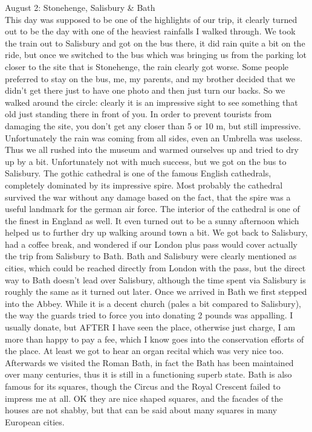 August 2: Stonehenge, Salisbury \& Bath\\
This day was supposed to be one of the highlights of our trip, it clearly turned out to be the day with one of the heaviest rainfalls I walked through. We took the train out to Salisbury and got on the bus there, it did rain quite a bit on the ride, but once we switched to the bus which was bringing us from the parking lot closer to the site that is Stonehenge, the rain clearly got worse. Some people preferred to stay on the bus, me, my parents, and my brother decided that we didn't get there just to have one photo and then just turn our backs. So we walked around the circle: clearly it is an impressive sight to see something that old just standing there in front of you. In order to prevent tourists from damaging the site, you don't get any closer than 5 or 10 m, but still impressive. Unfortunately the rain was coming from all sides, even an Umbrella was useless. Thus we all rushed into the museum and warmed ourselves up and tried to dry up by a bit. Unfortunately not with much success, but we got on the bus to Salisbury. The gothic cathedral is one of the famous English cathedrals, completely dominated by its impressive spire. Most probably the cathedral survived the war without any damage based on the fact, that the spire was a useful landmark for the german air force. The interior of the cathedral is one of the finest in England as well. It even turned out to be a sunny afternoon which helped us to further dry up walking around town a bit. We got back to Salisbury, had a coffee break, and wondered if our London plus pass would cover actually the trip from Salisbury to Bath. Bath and Salisbury were clearly mentioned as cities, which could be reached directly from London with the pass, but the direct way to Bath doesn't lead over Salisbury, although the time spent via Salisbury is roughly the same as it turned out later. Once we arrived in Bath we first stepped into the Abbey. While it is a decent church (pales a bit compared to Salisbury), the way the guards tried to force you into donating 2 pounds was appalling. I usually donate, but AFTER I have seen the place, otherwise just charge, I am more than happy to pay a fee, which I know goes into the conservation efforts of the place. At least we got to hear an organ recital which was very nice too. Afterwards we visited the Roman Bath, in fact the Bath has been maintained over many centuries, thus it is still in a functioning superb state. Bath is also famous for its squares, though the Circus and the Royal Crescent failed to impress me at all. OK they are nice shaped squares, and the facades of the houses are not shabby, but that can be said about many squares in many European cities.\\

